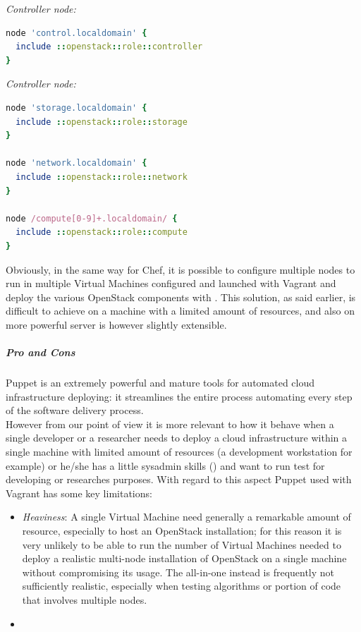 \textit{Controller node:}
\begin{lstlisting}[language=Ruby]
node 'control.localdomain' {
  include ::openstack::role::controller
}
\end{lstlisting}

\textit{Controller node:}
\begin{lstlisting}[language=Ruby]
node 'storage.localdomain' {
  include ::openstack::role::storage
}

node 'network.localdomain' {
  include ::openstack::role::network
}

node /compute[0-9]+.localdomain/ {
  include ::openstack::role::compute
}
\end{lstlisting}

Obviously, in the same way for Chef, it is possible to configure multiple nodes to run in multiple Virtual Machines configured and launched with Vagrant and deploy the various OpenStack components with . This solution, as said earlier, is difficult to achieve on a machine with a limited amount of resources, and also on more powerful server is however slightly extensible.

\subparagraph{Pro and Cons}
\label{subp:sota_puppet_pro_cons}
Puppet is an extremely powerful and mature tools for automated cloud infrastructure deploying: it streamlines the entire process automating every step of the software delivery process.\\
However from our point of view it is more relevant to how it behave when a single developer or a researcher needs to deploy a cloud infrastructure within a single machine with limited amount of resources (a development workstation for example) or he/she has a little sysadmin skills () and want to run test for developing or researches purposes. With regard to this aspect Puppet used with Vagrant has some key limitations:

\begin{itemize}
\item \textit{Heaviness}: A single Virtual Machine need generally a remarkable amount of resource, especially to host an OpenStack installation; for this reason it is very unlikely to be able to run the number of Virtual Machines needed to deploy a realistic multi-node installation of OpenStack on a single machine without compromising its usage. The all-in-one instead is frequently not sufficiently realistic, especially when testing algorithms or portion of code that involves multiple nodes.
\item {}
\end{itemize}

